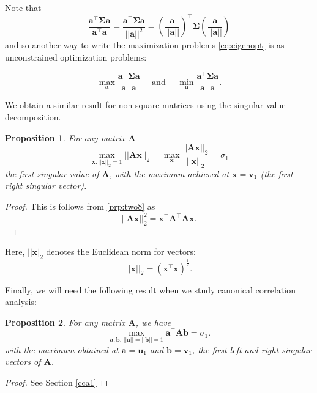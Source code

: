 \documentclass[]{book}
\newtheorem{proposition}{Proposition}[chapter]
\theoremstyle{definition}
\theoremstyle{definition}
\theoremstyle{definition}
\theoremstyle{remark}
\begin{document}
Note that \[\frac{\mathbf a^\top \boldsymbol{\Sigma}\mathbf a}{\mathbf a^\top\mathbf a}=\frac{\mathbf a^\top \boldsymbol{\Sigma}\mathbf a}{||\mathbf a||^2} = (\frac{\mathbf a}{||\mathbf a||})^\top \boldsymbol{\Sigma}(\frac{\mathbf a}{||\mathbf a||})\]
and so another way to write the maximization problems \eqref{eq:eigenopt} is as unconstrained optimization problems:

\[\max_{\mathbf a}\frac{\mathbf a^\top \boldsymbol{\Sigma}\mathbf a}{\mathbf a^\top\mathbf a}\quad \mbox{ and } \quad \min_{\mathbf a}\frac{\mathbf a^\top \boldsymbol{\Sigma}\mathbf a}{\mathbf a^\top\mathbf a}.\]

We obtain a similar result for non-square matrices using the singular value decomposition.

\begin{proposition}
\protect\hypertarget{prp:svdmax1}{}{\label{prp:svdmax1} }For any matrix \(\mathbf A\)
\[\max_{\mathbf x: ||\mathbf x||_2=1}||\mathbf A\mathbf x||_2=\max_{\mathbf x}\frac{||\mathbf A\mathbf x||_2}{||\mathbf x||_2}=\sigma_1\]
the first singular value of \(\mathbf A\), with the maximum achieved at \(\mathbf x=\mathbf v_1\) (the first right singular vector).
\end{proposition}
\begin{proof}
{}This is follows from \ref{prp:two8} as
\[||\mathbf A\mathbf x||_2^2=\mathbf x^\top \mathbf A^\top\mathbf A\mathbf x.\]
\end{proof}

Here, \(||\mathbf x|_2\) denotes the Euclidean norm for vectors:
\[||\mathbf x||_2 = (\mathbf x^\top \mathbf x)^{\frac{1}{2}}.\]

Finally, we will need the following result when we study canonical correlation analysis:

\begin{proposition}
\protect\hypertarget{prp:svdmax2}{}{\label{prp:svdmax2} }For any matrix \(\mathbf A\), we have
\[
\max_{\mathbf a, \mathbf b:\, \vert \vert \mathbf a\vert \vert=\vert \vert \mathbf b\vert \vert =1} \mathbf a^\top \mathbf A\mathbf b=\sigma_1.
\]
with the maximum obtained at \(\mathbf a=\mathbf u_1\) and \(\mathbf b=\mathbf v_1\), the first left and right singular vectors of \(\mathbf A\).
\end{proposition}

\begin{proof}
{}See Section \ref{cca1}
\end{proof}
\end{document}
